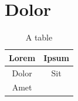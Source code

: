 \lipsum[4]

\section{Dolor}
\lipsum[3]

\begin{table}
\centering
\begin{tabular}{|c|c|}
\hline
\textbf{Lorem} & \textbf{Ipsum} \\
\hline
\hline
Dolor & Sit \\
\hline
Amet &  \\
\hline
\end{tabular}
\caption{A table}
\label{tab:example}
\end{table}

\lipsum[4-5]